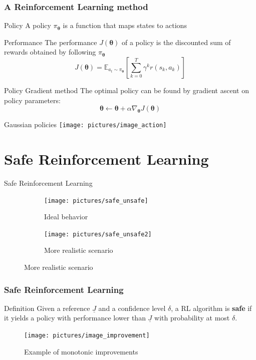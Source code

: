 \documentclass{beamer}
\newcommand{\vtheta}{{\boldsymbol{\theta}}}
\newcommand*{\gradj}{\nabla_{\vtheta}J(\vtheta)}
\begin{document}
\begin{frame}
\frametitle{A Reinforcement Learning method}
\begin{block}{Policy}
A policy $\pi_{\vtheta}$ is a function that maps states to actions
\end{block}

\begin{block}{Performance}
The performance $J(\vtheta)$ of a policy is the discounted sum of rewards obtained by following $\pi_{\vtheta}$
\[
J(\vtheta) = \mathbb{E}_{a_t \sim \pi_{\vtheta}}\left[ \sum_{k=0}^T \gamma^k r(s_k, a_k) \right]
\]
\end{block}

\begin{block}{Policy Gradient method}
The optimal policy can be found by gradient ascent on policy parameters: 
\[
\vtheta \gets \vtheta + \alpha \gradj
\]
\end{block}

\end{frame}



\begin{frame}{Gaussian policies}
\centering
\texttt{[image: pictures/image\_action]}
\end{frame}


\section{Safe Reinforcement Learning}

\begin{frame}{Safe Reinforcement Learning}
\begin{figure}
\begin{subfigure}[t]{0.495\textwidth}
\texttt{[image: pictures/safe\_unsafe]}
\caption{Ideal behavior}
\end{subfigure}
\hfill
\begin{subfigure}[t]{0.495\textwidth}
\texttt{[image: pictures/safe\_unsafe2]}
\caption{More realistic scenario}
\end{subfigure}
\end{figure}
\end{frame}

\begin{frame}
\frametitle{Safe Reinforcement Learning}

\begin{block}{Definition}
Given a reference $\underline{J}$ and a confidence level $\delta$, a RL algorithm is \textbf{safe} if it yields a policy with performance lower than $\underline{J}$ with probability at most $\delta$.

\end{block}

\vfill
\begin{figure}
\centering
\texttt{[image: pictures/image\_improvement]}
\caption{Example of monotonic improvements}
\end{figure}


\end{frame}
\end{document}
